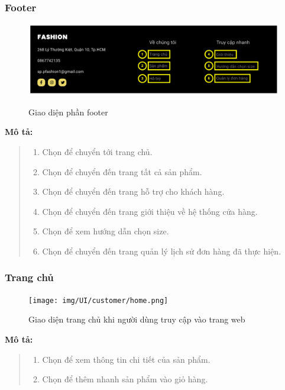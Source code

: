 \subsubsection{Footer}
\begin{figure}[!htp]
    \centering
    \includegraphics[width=5in]{img/UI/customer/footer.png}
    \label{7}
    \newline
    \caption{Giao diện phần footer}
\end{figure}
\textbf{Mô tả:}
\begin{quote}
    \begin{enumerate}
        \item Chọn để chuyển tới trang chủ.
        \item Chọn để chuyển đến trang tất cả sản phẩm.
        \item Chọn để chuyển đến trang hỗ trợ cho khách hàng.
        \item Chọn để chuyển đến trang giới thiệu về hệ thống cửa hàng.
        \item Chọn để xem hướng dẫn chọn size.
        \item Chọn để chuyển đến trang quản lý lịch sử đơn hàng đã thực hiện.
    \end{enumerate}
\end{quote}

\newpage
\subsubsection{Trang chủ}
\begin{figure}[!htp]
    \centering
    \texttt{[image: img/UI/customer/home.png]}
    \label{8}
    \newline
    \caption{Giao diện trang chủ khi người dùng truy cập vào trang web}
\end{figure}
\textbf{Mô tả:}
\begin{quote}
    \begin{enumerate}
        \item Chọn để xem thông tin chi tiết của sản phẩm.
        \item Chọn để thêm nhanh sản phẩm vào giỏ hàng.
    \end{enumerate}
\end{quote}


